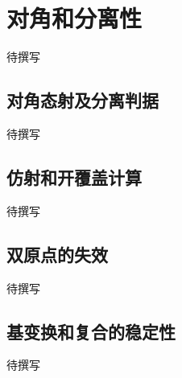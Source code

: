 
% 
% 

\section{对角和分离性}
\label{g5:sec:1201}

待撰写

\subsection{对角态射及分离判据}
\label{g5:subsec:1201:01}
待撰写

\subsection{仿射和开覆盖计算}
\label{g5:subsec:1201:02}
待撰写

\subsection{双原点的失效}
\label{g5:subsec:1201:03}
待撰写

\subsection{基变换和复合的稳定性}
\label{g5:subsec:1201:04}
待撰写
